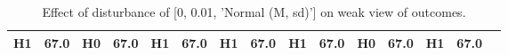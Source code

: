 \begin{table}
\begin{tabular}{l|cc|cc|cc|cc|cc|cc|cc}
\cellcolor{Bittersweet}H1&\cellcolor{Bittersweet}67.0&\cellcolor{Bittersweet}H0&\cellcolor{Bittersweet}67.0&\cellcolor{Bittersweet}H1&\cellcolor{Bittersweet}67.0&\cellcolor{Bittersweet}H1&\cellcolor{Bittersweet}67.0&\cellcolor{Bittersweet}H1&\cellcolor{Bittersweet}67.0&\cellcolor{Bittersweet}H0&\cellcolor{Bittersweet}67.0&\cellcolor{Bittersweet}H1&\cellcolor{Bittersweet}67.0\\\bottomrule\end{tabular}\caption{Effect of disturbance of [0, 0.01, 'Normal (M, sd)'] on weak view of outcomes.}\end{table}